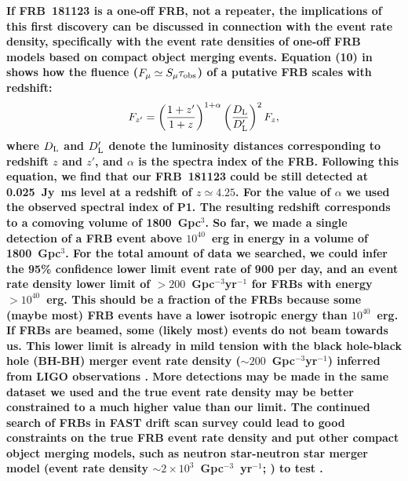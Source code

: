 {\bf 
If FRB~181123 is a one-off FRB, not a repeater, the implications of this first discovery can be discussed in connection with the event rate density, specifically with the event rate densities of one-off FRB models based on compact object merging events. 
Equation (10) in \citet{zhang18} shows how the fluence ($F_{\mu}\simeq  S_{\mu}\tau_{\rm obs}$) of a putative FRB scales with redshift: \begin{equation}
    F_{z'} = \left(\frac{1+z'}{1+z}\right)^{1+\alpha}\left(\frac{D_{\rm L}}{D_{\rm L}'}\right)^2F_{z},
\end{equation} 
where $D_{\rm L}$ and $D_{\rm L}'$ denote the luminosity distances corresponding to redshift $z$ and $z'$, and $\alpha$ is the spectra index of the FRB.
Following this equation, we find that our FRB~181123 could be still detected at 0.025~Jy~ms level at a redshift of $z\simeq4.25$. 
For the value of $\alpha$ we used the observed spectral index of P1.
The resulting redshift corresponds to a comoving volume of 1800~Gpc$^3$. 
So far, we made a single detection of a FRB event above $10^{40}$~erg in energy in a volume of 1800~Gpc$^3$. 
For the total amount of data we searched, we could infer the 95\% confidence lower limit event rate of 900 per day, and an event rate density lower limit of $>200$~Gpc$^{-3}$yr$^{-1}$ for FRBs with energy $>10^{40}$~erg. 
This should be a fraction of the FRBs because some (maybe most) FRB events have a lower isotropic energy than $10^{40}$~erg. If FRBs are beamed, some (likely most) events do not beam towards us. 
This lower limit is already in mild tension with the black hole-black hole (BH-BH) merger event rate density ($\sim 200$~Gpc$^{-3}$yr$^{-1}$) inferred from LIGO observations \citep{mg18}. More detections may be made in the same dataset we used and the true event rate density may be better constrained to a much higher value than our limit. 
The continued search of FRBs in FAST drift scan survey could lead to good constraints on the true FRB event rate density \citep{lml+20} and put other compact object merging models, such as neutron star-neutron star merger model (event rate density $\sim 2\times10^3$~Gpc$^{-3}$~yr$^{-1}$; \citet{aaa+17}) to test \citep[see also][]{wang20}.

}



